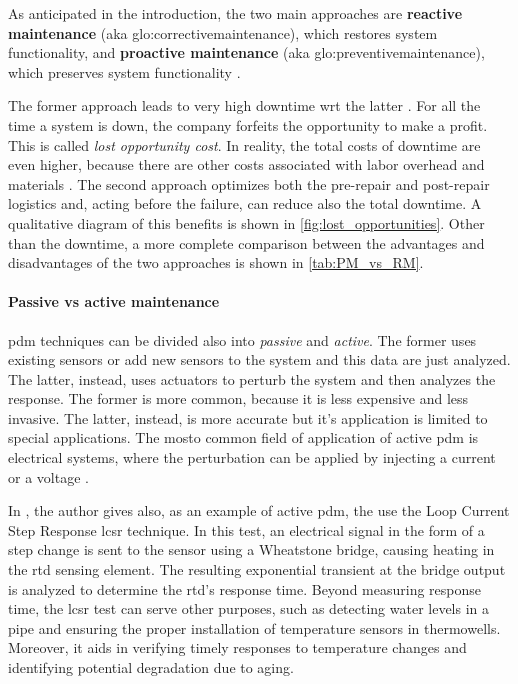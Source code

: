 As anticipated in the introduction, the two main approaches are \textbf{reactive maintenance} (\gls{aka} \gls{glo:correctivemaintenance}), which restores system functionality, and \textbf{proactive maintenance} (\gls{aka} \gls{glo:preventivemaintenance}), which preserves system functionality \cite{Rely_maint_book}.

The former approach leads to very high downtime \gls{wrt} the latter \cite{NIST}. For all the time a system is down, the company forfeits the opportunity to make a profit. This is called \emph{lost opportunity cost}. In reality, the total costs of downtime are even higher, because there are other costs associated with labor overhead and materials \cite{Lost_Opport_Cost}. The second approach optimizes both the pre-repair and post-repair logistics and, acting before the failure, can reduce also the total downtime. A qualitative diagram of this benefits is shown in \autoref{fig:lost_opportunities}. Other than the downtime, a more complete comparison between the advantages and disadvantages of the two approaches is shown in \autoref{tab:PM_vs_RM}.



\paragraph{Passive vs active maintenance}
\gls{pdm} techniques can be divided also into \emph{passive} and \emph{active}. The former uses existing sensors or add new sensors to the system and this data are just analyzed. The latter, instead, uses actuators to perturb the system and then analyzes the response. The former is more common, because it is less expensive and less invasive. The latter, instead, is more accurate but it's application is limited to special applications. The mosto common field of application of active \gls{pdm} is electrical systems, where the perturbation can be applied by injecting a current or a voltage \cite{State_Art_Hasemian_2011}.

In \cite{State_Art_Hasemian_2011}, the author gives also, as an example of active \gls{pdm}, the use the Loop Current Step Response \gls{lcsr} technique. In this test, an electrical signal in the form of a step change is sent to the sensor using a Wheatstone bridge, causing heating in the \gls{rtd} sensing element. The resulting exponential transient at the bridge output is analyzed to determine the \gls{rtd}'s response time. Beyond measuring response time, the \gls{lcsr} test can serve other purposes, such as detecting water levels in a pipe and ensuring the proper installation of temperature sensors in thermowells. Moreover, it aids in verifying timely responses to temperature changes and identifying potential degradation due to aging.

